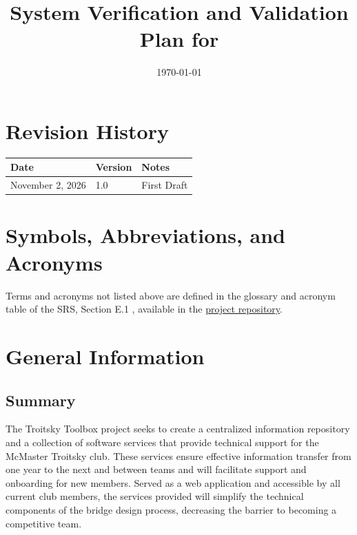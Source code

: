 \documentclass[12pt, titlepage]{article}
\begin{document}
\title{System Verification and Validation Plan for \progname{}} 
\author{\authname}
\date{\today}
	
\maketitle


\section*{Revision History}

\begin{tabularx}{\textwidth}{p{3cm}p{2cm}X}
\toprule {\bf Date} & {\bf Version} & {\bf Notes}\\
\midrule
November 2, 2026 & 1.0 & First Draft\\
\bottomrule
\end{tabularx}



\newpage

\tableofcontents

\listoftables


\newpage

\section{Symbols, Abbreviations, and Acronyms}

\renewcommand{\arraystretch}{1.2}

Terms and acronyms not listed above are defined in the glossary and acronym
table of the SRS, Section E.1 \citep{TroitskySRS}, available in the
\href{https://github.com/JackEaston4/Troitsky-Toolbox/blob/main/pdfs/SRS/SRS.pdf}{project
repository}.

\newpage



 

\section{General Information}

\subsection{Summary}

The Troitsky Toolbox project seeks to create a centralized information repository and a collection of software
services that provide technical support for the McMaster Troitsky club. These services ensure effective information transfer 
from one year to the next and between teams and will facilitate support and onboarding for new members. 
Served as a web application and accessible by all current club members, the services provided will simplify the 
technical components of the bridge design process, decreasing the barrier to becoming a competitive team. 
\end{document}
